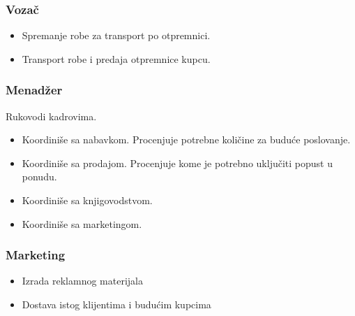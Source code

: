 \subsubsection{Vozač}
\begin{itemize}
\item Spremanje robe za transport po otpremnici.
\item Transport robe i predaja otpremnice kupcu.
\end{itemize}

\subsubsection{Menadžer}
Rukovodi kadrovima.
\begin{itemize}
\item Koordiniše sa nabavkom. Procenjuje potrebne količine za buduće poslovanje.
\item Koordiniše sa prodajom. Procenjuje kome je potrebno uključiti popust u ponudu.
\item Koordiniše sa knjigovodstvom.
\item Koordiniše sa marketingom.
\end{itemize}

\subsubsection{Marketing}
\begin{itemize}
\item Izrada reklamnog materijala
\item Dostava istog klijentima i budućim kupcima
\end{itemize}

\clearpage